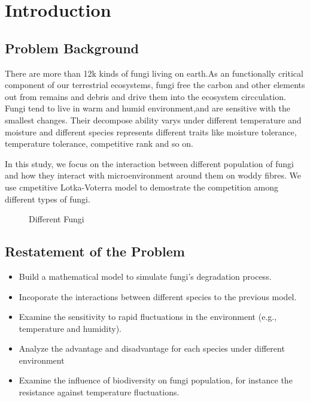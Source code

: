 \section{Introduction}
	\subsection{Problem Background}
	There are more than 12k kinds of fungi living on earth.As an functionally critical component of our terrestrial ecosystems, fungi free the carbon and other elements out from remains and debris and drive them into the ecosystem circculation. Fungi tend to live in warm and humid environment,and are sensitive with the smallest changes. Their decompose ability varys under different temperature and moisture and different species represents different traits like moisture tolerance, temperature tolerance, competitive rank and so on.

	In this study, we focus on the interaction between different population of fungi and how they interact with microenvironment around them on woddy fibres. We use cmpetitive Lotka-Voterra model to demostrate the competition among different types of fungi.
	
\begin{figure}[htbp]
\centering
{}%
%
%
\centering
\caption{Different Fungi}
\end{figure}

	
	\subsection{Restatement of the Problem}
	\begin{itemize}
		\item Build a mathematical model to simulate fungi's degradation process.
		\item Incoporate the interactions between different species to the previous model.
		\item Examine the sensitivity to rapid fluctuations in the environment (e.g., temperature and humidity).
		\item Analyze the advantage and disadvantage for each species under different environment
		\item Examine the influence of biodiversity on fungi population, for instance the resistance against temperature fluctuations.
	\end{itemize}
	
